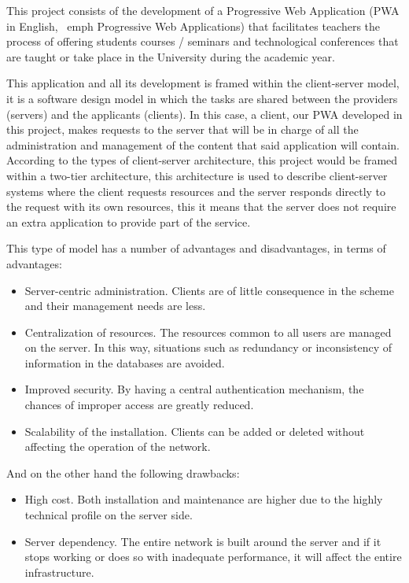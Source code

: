 \documentclass[a4paper, 12pt]{book}
\begin{document}
	This project consists of the development of a Progressive Web Application (PWA in English, \ emph {Progressive Web Applications}) that facilitates teachers the process of offering students courses / seminars and technological conferences that are taught or take place in the University during the academic year.

	This application and all its development is framed within the client-server model, it is a software design model in which the tasks are shared between the providers (servers) and the applicants (clients). In this case, a client, our PWA developed in this project, makes requests to the server that will be in charge of all the administration and management of the content that said application will contain. According to the types of client-server architecture, this project would be framed within a two-tier architecture, this architecture is used to describe client-server systems where the client requests resources and the server responds directly to the request with its own resources, this it means that the server does not require an extra application to provide part of the service.
	
	This type of model has a number of advantages and disadvantages, in terms of advantages:
	\begin{itemize}
  	\item Server-centric administration. Clients are of little consequence in the scheme and their management needs are less.
  	\item Centralization of resources. The resources common to all users are managed on the server. In this way, situations such as redundancy or inconsistency of information in the databases are avoided.
  	\item Improved security. By having a central authentication mechanism, the chances of improper access are greatly reduced.
  	\item Scalability of the installation. Clients can be added or deleted without affecting the operation of the network.
	\end{itemize}
	
	And on the other hand the following drawbacks:
	\begin{itemize}
  	\item High cost. Both installation and maintenance are higher due to the highly technical profile on the server side.
  	\item Server dependency. The entire network is built around the server and if it stops working or does so with inadequate performance, it will affect the entire infrastructure.
	\end{itemize}
\end{document}
